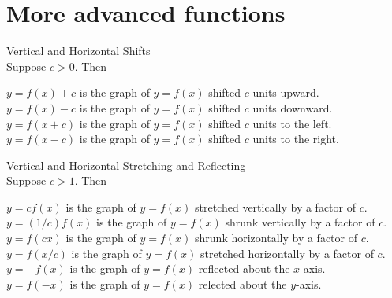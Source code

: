 %
%

\section{More advanced functions}

Vertical and Horizontal Shifts\\

Suppose \(c>0\). Then
\begin{center}
\(y=f(x)+c\) is the graph of \(y=f(x)\) shifted \(c\) units upward.\\
\(y=f(x)-c\) is the graph of \(y=f(x)\) shifted \(c\) units downward.\\
\(y=f(x+c)\) is the graph of \(y=f(x)\) shifted \(c\) units to the left.\\
\(y=f(x-c)\) is the graph of \(y=f(x)\) shifted \(c\) units to the right.\\
\end{center}
Vertical and Horizontal Stretching and Reflecting\\

Suppose \(c>1\). Then
\begin{center}
\(y=cf(x)\) is the graph of \(y=f(x)\) stretched vertically by a factor of \(c\).\\
\(y=(1/c)f(x)\) is the graph of \(y=f(x)\) shrunk vertically by a factor of \(c\).\\
\(y=f(cx)\) is the graph of \(y=f(x)\) shrunk horizontally by a factor of \(c\).\\
\(y=f(x/c)\) is the graph of \(y=f(x)\) stretched horizontally by a factor of \(c\).\\
\(y=-f(x)\) is the graph of \(y=f(x)\) reflected about the \(x\)-axis.\\
\(y=f(-x)\) is the graph of \(y=f(x)\) relected about the \(y\)-axis.
\end{center}
